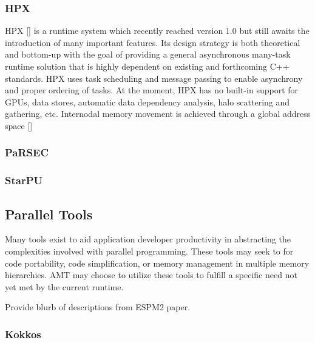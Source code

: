 \documentclass[12pt]{article}
\begin{document}
\subsubsection{HPX}
\label{ch:hpx}
HPX [] is a runtime system which recently reached version 1.0 but still awaits the introduction of many important features.  Its design strategy is both theoretical and bottom-up with the goal of providing a general asynchronous many-task runtime solution that is highly dependent on existing and forthcoming C++ standards.   HPX uses task scheduling and message passing to enable asynchrony and proper ordering of tasks.  At the moment, HPX has no built-in support for GPUs, data stores, automatic data dependency analysis, halo scattering and gathering, etc.   Internodal memory movement is achieved through a global address space []

\subsubsection{PaRSEC}
\label{ch:PaRSEC}

\subsubsection{StarPU}
\label{ch:StarPU}


\subsection{Parallel Tools}


Many tools exist to aid application developer productivity in abstracting the complexities involved with parallel programming.  These tools may seek to for code portability, code simplification, or memory management in multiple memory hierarchies.  AMT  may choose to utilize these tools to fulfill a specific need not yet met by the current runtime. 

Provide blurb of descriptions from ESPM2 paper.

\subsubsection{Kokkos}
\end{document}
